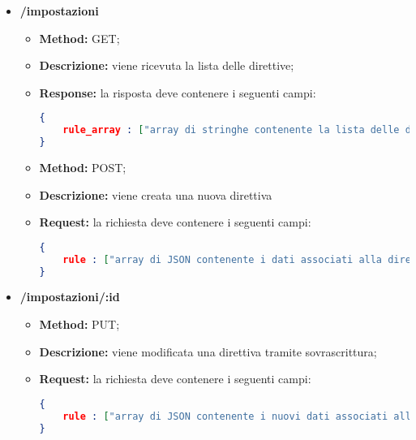 \begin{itemize}

\item \textbf{/impostazioni}\\

\begin{itemize}
\item \textbf{Method:} GET;
\item \textbf{Descrizione:} viene ricevuta la lista delle direttive;
\item \textbf{Response:} la risposta deve contenere i seguenti campi:
\begin{lstlisting}[language=json,firstnumber=1]
{
	rule_array : ["array di stringhe contenente la lista delle direttive"]
}
\end{lstlisting}
\end{itemize}

\begin{itemize}
\item \textbf{Method:} POST;
\item \textbf{Descrizione:} viene creata una nuova direttiva
\item \textbf{Request:} la richiesta deve contenere i seguenti campi:
\begin{lstlisting}[language=json,firstnumber=1]
{
	rule : ["array di JSON contenente i dati associati alla direttiva da creare"]
}
\end{lstlisting}
\end{itemize}

\item \textbf{/impostazioni/:id}\\

\begin{itemize}
\item \textbf{Method:} PUT; 
\item \textbf{Descrizione:} viene modificata una direttiva tramite sovrascrittura;
\item \textbf{Request:} la richiesta deve contenere i seguenti campi:
\begin{lstlisting}[language=json,firstnumber=1]
{
	rule : ["array di JSON contenente i nuovi dati associati alla direttiva da modificare"]
}
\end{lstlisting} 

\end{itemize}


\end{itemize}
